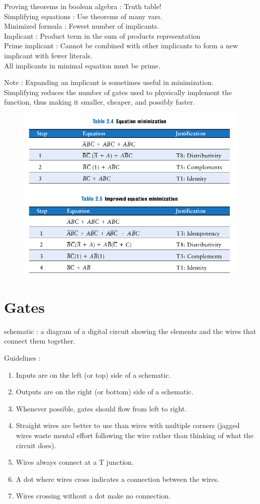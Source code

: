 \documentclass{article}[12pt]
\begin{document}
Proving theorems in boolean algebra : Truth table! \\
Simplifying equations : Use theorems of many vars. \\ 
Minimized formula : Fewest number of implicants. \\
Implicant : Product term in the sum of products representation \\
Prime implicant : Cannot be combined with other implicants to form a new implicant with fewer literals. \\
All implicants in minimal equation must be prime.

Note : Expanding an implicant is sometimes useful in minimization. \\ 
Simplifying reduces the number of gates used to physically
implement the function, thus making it smaller, cheaper, and possibly
faster.
\begin{figure}[htbp]
\centerline{\includegraphics[scale = 0.25]{../Images/impl.png}}
\end{figure}

\section[short]{Gates}

schematic : a diagram of a digital circuit showing the elements and
the wires that connect them together.

Guidelines : 
\begin{enumerate}
  \item Inputs are on the left (or top) side of a schematic.
  \item Outputs are on the right (or bottom) side of a schematic.
  \item Whenever possible, gates should flow from left to right.
  \item Straight wires are better to use than wires with multiple corners
  (jagged wires waste mental effort following the wire rather than
  thinking of what the circuit does).
  \item Wires always connect at a T junction.
  \item A dot where wires cross indicates a connection between the wires.
  \item Wires crossing without a dot make no connection.
\end{enumerate}
\end{document}
